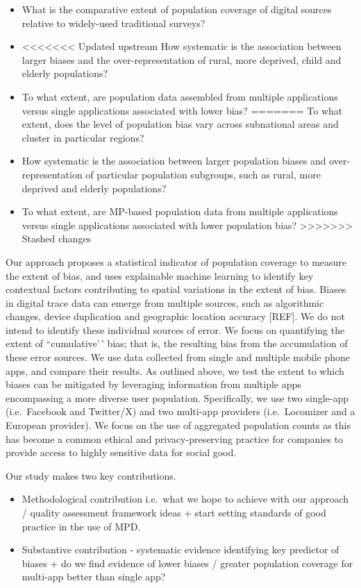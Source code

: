 \documentclass[]{rsos}%
\providecommand{\tightlist}{%
  \setlength{\itemsep}{0pt}\setlength{\parskip}{0pt}}
\begin{document}
\begin{itemize}
\tightlist
\item
  What is the comparative extent of population coverage of digital
  sources relative to widely-used traditional surveys?
\item
<<<<<<< Updated upstream
  How systematic is the association between larger biases and the
  over-representation of rural, more deprived, child and elderly
  populations?
\item
  To what extent, are population data assembled from multiple
  applications versus single applications associated with lower bias?
=======
  To what extent, does the level of population bias vary across
  subnational areas and cluster in particular regions?
\item
  How systematic is the association between larger population biases
  and over-representation of particular population subgroups, such as
  rural, more deprived and elderly populations?
\item
  To what extent, are MP-based population data from multiple
  applications versus single applications associated with lower
  population bias?
>>>>>>> Stashed changes
\end{itemize}

Our approach proposes a statistical indicator of population coverage to
measure the extent of bias, and uses explainable machine learning to
identify key contextual factors contributing to spatial variations in
the extent of bias. Biases in digital trace data can emerge from
multiple sources, such as algorithmic changes, device duplication and
geographic location accuracy {[}REF{]}. We do not intend to identify these
individual sources of error. We focus on quantifying the extent of
``cumulative'\,' bias; that is, the resulting bias from the accumulation
of these error sources. We use data collected from single and multiple
mobile phone apps, and compare their results. As outlined above, we test
the extent to which biases can be mitigated by leveraging information
from multiple apps encompassing a more diverse user population.
Specifically, we use two single-app (i.e.~Facebook and Twitter/X) and
two multi-app providers (i.e.~Locomizer and a European provider). We
focus on the use of aggregated population counts as this has become a
common ethical and privacy-preserving practice for companies to provide
access to highly sensitive data for social good.

Our study makes two key contributions.

\begin{itemize}
\item
  Methodological contribution i.e.~what we hope to achieve with our
  approach / quality assessment framework ideas + start setting
  standards of good practice in the use of MPD.
\item
  Substantive contribution - systematic evidence identifying key
  predictor of biases + do we find evidence of lower biases / greater
  population coverage for multi-app better than single app?
\end{itemize}
\end{document}
